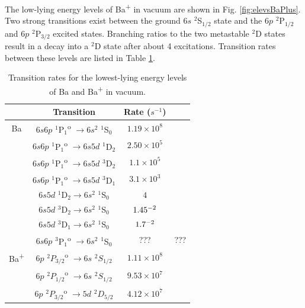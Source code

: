 The low-lying energy levels of Ba\textsuperscript{+} in vacuum are shown in Fig. \ref{fig:elevsBaPlus}.  Two strong transitions exist between the ground $6s$ $^{2}$S$_{1/2}$ state and the $6p$ $^{2}$P$_{1/2}$ and $6p$ $^{2}$P$_{3/2}$ excited states.  Branching ratios to the two metastable $^{2}$D states result in a decay into a $^{2}$D state after about 4 excitations.  Transition rates between these levels are listed in Table \ref{table:BaTransitions}.    

\begin{table}[!htbp]
\caption{Transition rates for the lowest-lying energy levels of Ba and Ba\textsuperscript{+} in vacuum.} %
\label{table:BaTransitions}
\begin{tabular}{c|c|c c}
& Transition & Rate ($s^{-1}$) &  \\
\hline
Ba & $6s6p$ $^{1}$P$_{1}$\textsuperscript{o} $\rightarrow 6s^{2}$ $^{1}$S$_{0}$ & $1.19 \times 10^{8}$ & \cite{BaAllowedTransitions} \\
& $6s6p$ $^{1}$P$_{1}$\textsuperscript{o} $\rightarrow 6s5d$ $^{1}$D$_{2}$ & $2.50 \times 10^{5}$ & \cite{BaAllowedTransitions} \\
& $6s6p$ $^{1}$P$_{1}$\textsuperscript{o} $\rightarrow 6s5d$ $^{3}$D$_{2}$ & $1.1 \times 10^{5}$ & \cite{BaAllowedTransitions} \\
& $6s6p$ $^{1}$P$_{1}$\textsuperscript{o} $\rightarrow 6s5d$ $^{3}$D$_{1}$ & $3.1 \times 10^{3}$ & \cite{BaAllowedTransitions} \\
& $6s5d$ $^{1}$D$_{2} \rightarrow 6s^{2}$ $^{1}$S$_{0}$ & $4$ & \cite{Ba1D2and3D1} \\
& $6s5d$ $^{3}$D$_{2} \rightarrow 6s^{2}$ $^{1}$S$_{0}$ & $1.45 \time 10^{-2}$ & \cite{Ba3D2} \\
& $6s5d$ $^{3}$D$_{1} \rightarrow 6s^{2}$ $^{1}$S$_{0}$ & $1.7 \time 10^{-2}$ & \cite{Ba1D2and3D1} \\
& $6s6p$ $^{3}$P$_{1}$\textsuperscript{o} $\rightarrow 6s^{2}$ $^{1}$S$_{0}$ & {\color{red}???} & {\color{red}???}\\
\hline
Ba\textsuperscript{+} & $6p$ $^{2}P_{3/2}$\textsuperscript{o} $\rightarrow 6s $ $^{2}S_{1/2}$ & $1.11 \times 10^{8}$ & \cite{BaAllowedTransitions} \\
& $6p$ $^{2}P_{1/2}$\textsuperscript{o} $\rightarrow 6s$ $^{2}S_{1/2}$ & $9.53 \times 10^{7}$ & \cite{BaAllowedTransitions} \\
& $6p$ $^{2}P_{3/2}$\textsuperscript{o} $\rightarrow 5d$ $^{2}D_{5/2}$ & $4.12 \times 10^{7}$ & \cite{BaAllowedTransitions} \\

\end{tabular}
\end{table}
